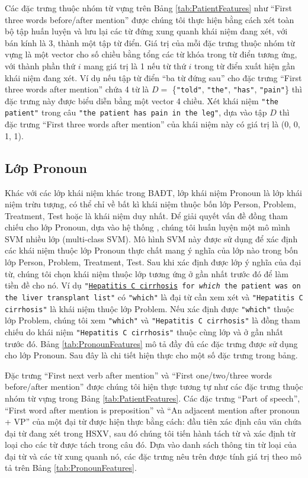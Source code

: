 Các đặc trưng thuộc nhóm từ vựng trên Bảng \ref{tab:PatientFeatures} như ``First three words before/after mention'' được chúng tôi thực hiện bằng cách xét toàn bộ tập huấn luyện và lưu lại các từ đứng xung quanh khái niệm đang xét, với bán kính là 3, thành một tập từ điển. Giá trị của mỗi đặc trưng thuộc nhóm từ vựng là một vector cho số chiều bằng tổng các từ khóa trong từ điển tương ứng, với thành phần thứ $i$ mang giá trị là 1 nếu từ thứ $i$ trong từ điển xuất hiện gần khái niệm đang xét. Ví dụ nếu tập từ điển ``ba từ đứng sau'' cho đặc trưng ``First three words after mention'' chứa 4 từ là $D=$ \{\texttt{"told"}, \texttt{"the"}, \texttt{"has"}, \texttt{"pain"}\} thì đặc trưng này được biểu diễn bằng một vector 4 chiều. Xét khái niệm \texttt{"the patient"} trong câu \texttt{"the patient has pain in the leg"}, dựa vào tập $D$ thì đặc trưng ``First three words after mention'' của khái niệm này có giá trị là (0, 0, 1, 1).

\subsection*{Lớp Pronoun}
Khác với các lớp khái niệm khác trong BAĐT, lớp khái niệm Pronoun là lớp khái niệm trừu tượng, có thể chỉ về bất kì khái niệm thuộc bốn lớp Person, Problem, Treatment, Test hoặc là khái niệm duy nhất. Để giải quyết vấn đề đồng tham chiếu cho lớp Pronoun, dựa vào hệ thống \cite{YanXu2012}, chúng tôi huấn luyện một mô mình SVM nhiều lớp (multi-class SVM). Mô hình SVM này được sử dụng để xác định các khái niệm thuộc lớp Pronoun thực chất mang ý nghĩa của lớp nào trong bốn lớp Person, Problem, Treatment, Test. Sau khi xác định được lớp ý nghĩa của đại từ, chúng tôi chọn khái niệm thuộc lớp tương ứng ở gần nhất trước đó để làm tiền đề cho nó. Ví dụ \texttt{"\underline{Hepatitis C cirrhosis} for \textsl{which} the patient was on the liver transplant list"} có \texttt{"which"} là đại từ cần xem xét và \texttt{"Hepatitis C cirrhosis"} là khái niệm thuộc lớp Problem. Nếu xác định được \texttt{"which"} thuộc lớp Problem, chúng tôi xem \texttt{"which"} và \texttt{"Hepatitis C cirrhosis"} là đồng tham chiếu do khái niệm \texttt{"Hepatitis C cirrhosis"} thuộc cùng lớp và ở gần nhất trước đó. Bảng \ref{tab:PronounFeatures} mô tả đầy đủ các đặc trưng được sử dụng cho lớp Pronoun. Sau đây là chi tiết hiện thực cho một số đặc trưng trong bảng.

Đặc trưng ``First next verb after mention'' và ``First one/two/three words before/after mention'' được chúng tôi hiện thực tương tự như các đặc trưng thuộc nhóm từ vựng trong Bảng \ref{tab:PatientFeatures}. Các đặc trưng ``Part of speech'', ``First word after mention is preposition'' và ``An adjacent mention after pronoun + VP'' của một đại từ được hiện thực bằng cách: đầu tiên xác định câu văn chứa đại từ đang xét trong HSXV, sau đó chúng tôi tiến hành tách từ và xác định từ loại cho các từ được tách trong câu đó. Dựa vào danh sách thông tin từ loại của đại từ và các từ xung quanh nó, các đặc trưng nêu trên được tính giá trị theo mô tả trên Bảng \ref{tab:PronounFeatures}.


